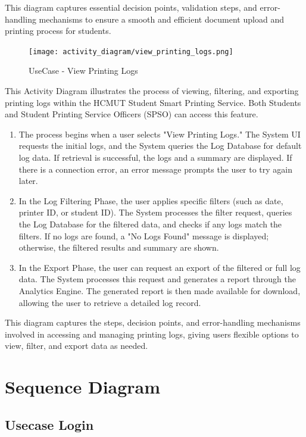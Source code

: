 This diagram captures essential decision points, validation steps, and error-handling mechanisms to ensure a smooth and efficient document upload and printing process for students.

\begin{figure}[H]
    \centering
    \texttt{[image: activity\_diagram/view\_printing\_logs.png]}
    \caption{UseCase - View Printing Logs}
\end{figure}
This Activity Diagram illustrates the process of viewing, filtering, and exporting printing logs within the HCMUT Student Smart Printing Service. Both Students and Student Printing Service Officers (SPSO) can access this feature.
\begin{enumerate}
    \item The process begins when a user selects "View Printing Logs." The System UI requests the initial logs, and the System queries the Log Database for default log data. If retrieval is successful, the logs and a summary are displayed. If there is a connection error, an error message prompts the user to try again later.
    \item In the Log Filtering Phase, the user applies specific filters (such as date, printer ID, or student ID). The System processes the filter request, queries the Log Database for the filtered data, and checks if any logs match the filters. If no logs are found, a "No Logs Found" message is displayed; otherwise, the filtered results and summary are shown.
    \item In the Export Phase, the user can request an export of the filtered or full log data. The System processes this request and generates a report through the Analytics Engine. The generated report is then made available for download, allowing the user to retrieve a detailed log record.
\end{enumerate}
This diagram captures the steps, decision points, and error-handling mechanisms involved in accessing and managing printing logs, giving users flexible options to view, filter, and export data as needed.


\section{Sequence Diagram}

\subsection{Usecase Login}

